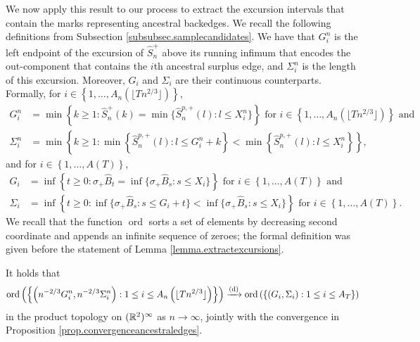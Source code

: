 We now apply this result to our process to extract the excursion intervals that contain the marks representing ancestral backedges. We recall the following definitions from Subsection  \ref{subsubsec.samplecandidates}. We have that $G_i^n$ is the left endpoint of the excursion of $\hat{S}_n^+$ above its running infimum that encodes the out-component that contains the $i$th ancestral surplus edge, and $\Sigma_i^n$ is the length of this excursion.  Moreover, $G_i$ and $\Sigma_i$ are their continuous counterparts. Formally, for $i\in \left\{1,\dots, A_n\left(\lfloor T n^{2/3}\rfloor\right)\right\}$, 
\begin{align*}G_i^n&=\min\left\{k\geq 1:\hat{S}^{+}_n(k)=\min\{\hat{S}^{p,+}_n(l):l\leq X_i^n\}\right\}\text{ for }i\in \left\{1,\dots, A_n\left(\lfloor T n^{2/3}\rfloor\right)\right\}\text{ and}\\
\Sigma_i^n&=\min\left\{k \geq 1: \min\left\{\hat{S}^{p,+}_n(l):l\leq G_i^n+k\right\} < \min\left\{\hat{S}^{p,+}_n(l):l\leq X_i^n\right\}\right\},
\end{align*}
and for $i\in \left\{1,\dots, A\left(T\right)\right\}$, 
\begin{align*}
G_i&=\inf\left\{t\geq 0:\sigma_+\hat{B}_t=\inf\{\sigma_+\hat{B}_s:s\leq X_i\}\right\}\text{ for }i\in \left\{1,\dots,A(T )\right\}\text{ and}\\
\Sigma_i&=\inf\left\{ t\geq 0: \inf\{\sigma_+\hat{B}_s:s\leq G_i+t\} < \inf\{\sigma_+\hat{B}_s:s\leq X_i\}\right\}\text{ for }i\in \left\{1,\dots,A(T )\right\}.
\end{align*}
We recall that the function $\operatorname{ord}$ sorts a set of elements by decreasing second coordinate and appends an infinite sequence of zeroes; the formal definition was given before the statement of Lemma \ref{lemma.extractexcursions}. 
\begin{proposition}\label{prop.extractexcursions}
It holds that
$$\operatorname{ord}\left(\left\{\left(n^{-2/3}G_i^n,n^{-2/3}\Sigma_i^n\right):1\leq i \leq A_n\left(\lfloor T n^{2/3}\rfloor\right)\right\}\right)\xrightarrow[]{\mathrm{(d)}} \operatorname{ord}\left(\left\{(G_i,\Sigma_i):1\leq i \leq A_T\right\}\right)$$
in the product topology on $({\mathbb R}^2)^\infty$ as $n\to \infty$, jointly with the convergence in Proposition \ref{prop.convergenceancestraledges}. 
\end{proposition}
